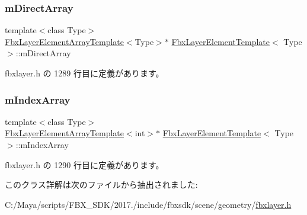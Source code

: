 \subsubsection{\texorpdfstring{m\+Direct\+Array}{mDirectArray}}
{\footnotesize\ttfamily template$<$class Type$>$ \\
\hyperlink{class_fbx_layer_element_array_template}{Fbx\+Layer\+Element\+Array\+Template}$<$Type$>$$\ast$ \hyperlink{class_fbx_layer_element_template}{Fbx\+Layer\+Element\+Template}$<$ Type $>$\+::m\+Direct\+Array}



 fbxlayer.\+h の 1289 行目に定義があります。

\mbox{\label{class_fbx_layer_element_template_a4aa88a6936b2ab08e150ff6336a91a7d}} 
\subsubsection{\texorpdfstring{m\+Index\+Array}{mIndexArray}}
{\footnotesize\ttfamily template$<$class Type$>$ \\
\hyperlink{class_fbx_layer_element_array_template}{Fbx\+Layer\+Element\+Array\+Template}$<$int$>$$\ast$ \hyperlink{class_fbx_layer_element_template}{Fbx\+Layer\+Element\+Template}$<$ Type $>$\+::m\+Index\+Array}



 fbxlayer.\+h の 1290 行目に定義があります。



このクラス詳解は次のファイルから抽出されました\+:\begin{DoxyCompactItemize}
\item 
C\+:/\+Maya/scripts/\+F\+B\+X\+\_\+\+S\+D\+K/2017./include/fbxsdk/scene/geometry/\hyperlink{fbxlayer_8h}{fbxlayer.\+h}\end{DoxyCompactItemize}
